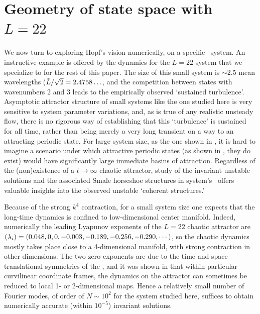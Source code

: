 
\section{Geometry of state space with $L=22$}
\label{sec:L22}

We now turn to exploring Hopf's vision
numerically, on a specific \KS\ system.
An instructive example is offered by the dynamics for
the  $L=22$  system
that we specialize to for the rest of this paper.
The size of this
small system is $\sim 2.5$ mean wavelengths
($\tilde{L}/\sqrt{2}= 2.4758\ldots$, %
and the competition between states with wavenumbers 2 and 3
leads to the empirically observed `sustained turbulence'.
Asymptotic attractor structure of small systems like
the one studied here
is very sensitive to system parameter variations, and,
as is true of
any realistic unsteady flow, there is no rigorous way of
establishing that this `turbulence' is sustained for all time,
rather than being
merely a very long transient on a way to an
attracting periodic state.
For large system size, as the one shown in , it is
hard to imagine a scenario under which attractive periodic states
(as shown in , they do exist) would have significantly
large immediate basins of attraction.
Regardless of the
(non)existence of a $t \to \infty$ chaotic attractor, study
of the invariant unstable solutions and the associated Smale
horseshoe structures in system's \statesp\ offers valuable
insights into the observed unstable `coherent structures.'

Because of the strong $k^4$ contraction, for a small system size
one expects that the long-time dynamics is confined to low-dimensional
center manifold. Indeed, numerically the leading Lyapunov exponents of the
$L=22$ chaotic attractor are
$(\lambda_i) = (0.048, 0, 0, -0.003, -0.189, -0.256, -0.290, \cdots)$,
so the chaotic dynamics mostly takes
place close to a 4-dimensional manifold, with strong
contraction in other dimensions.  The two zero exponents
are due to the
time and space translational symmetries of the \KSe,
and it was shown in 
that within particular curvilinear coordinate frames, the
dynamics on the attractor can sometimes be reduced to
local 1- or 2-dimensional maps.
Hence a relatively small
number of Fourier modes, of order of $N \sim 10^2$
for the system studied here, suffices to obtain
numerically accurate (within $10^{-5}$) invariant
solutions.


